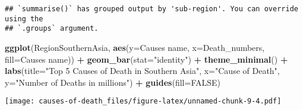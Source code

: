 \documentclass[
]{article}
\newenvironment{Shaded}{\begin{snugshade}}{\end{snugshade}}
\newcommand{\AttributeTok}[1]{\textcolor[rgb]{0.13,0.29,0.53}{#1}}
\newcommand{\ConstantTok}[1]{\textcolor[rgb]{0.56,0.35,0.01}{#1}}
\newcommand{\FunctionTok}[1]{\textcolor[rgb]{0.13,0.29,0.53}{\textbf{#1}}}
\newcommand{\NormalTok}[1]{#1}
\newcommand{\SpecialCharTok}[1]{\textcolor[rgb]{0.81,0.36,0.00}{\textbf{#1}}}
\newcommand{\StringTok}[1]{\textcolor[rgb]{0.31,0.60,0.02}{#1}}
\begin{document}
\begin{verbatim}
## `summarise()` has grouped output by 'sub-region'. You can override using the
## `.groups` argument.
\end{verbatim}

\begin{Shaded}
\begin{Highlighting}[]
\FunctionTok{ggplot}\NormalTok{(RegionSouthernAsia, }\FunctionTok{aes}\NormalTok{(}\AttributeTok{y=}\StringTok{\textasciigrave{}}\AttributeTok{Causes name}\StringTok{\textasciigrave{}}\NormalTok{, }\AttributeTok{x=}\NormalTok{Death\_numbers, }\AttributeTok{fill=}\StringTok{\textasciigrave{}}\AttributeTok{Causes name}\StringTok{\textasciigrave{}}\NormalTok{)) }\SpecialCharTok{+}
  \FunctionTok{geom\_bar}\NormalTok{(}\AttributeTok{stat=}\StringTok{"identity"}\NormalTok{) }\SpecialCharTok{+}
  \FunctionTok{theme\_minimal}\NormalTok{() }\SpecialCharTok{+} 
  \FunctionTok{labs}\NormalTok{(}\AttributeTok{title=}\StringTok{"Top 5 Causes of Death in Southern Asia"}\NormalTok{,}
       \AttributeTok{x=}\StringTok{"Cause of Death"}\NormalTok{,}
       \AttributeTok{y=}\StringTok{"Number of Deaths in millions"}\NormalTok{) }\SpecialCharTok{+}
  \FunctionTok{guides}\NormalTok{(}\AttributeTok{fill=}\ConstantTok{FALSE}\NormalTok{)}
\end{Highlighting}
\end{Shaded}

\texttt{[image: causes-of-death\_files/figure-latex/unnamed-chunk-9-4.pdf]}
\end{document}
